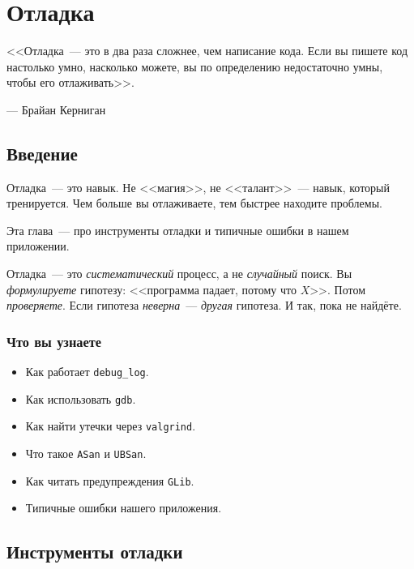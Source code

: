 
\chapter{Отладка}
\label{ch:debug}

\epigraph{<<Отладка~--- это в два раза сложнее, чем написание кода.
Если вы пишете код настолько умно, насколько можете, вы по
определению недостаточно умны, чтобы его отлаживать>>.}{---
Брайан Керниган}

\section{Введение}
\label{sec:debug-intro}

Отладка~--- это навык. Не <<магия>>, не <<талант>>~---
навык, который тренируется. Чем больше вы
отлаживаете, тем быстрее находите проблемы.

Эта глава~--- про инструменты отладки и типичные
ошибки в нашем приложении.

\begin{ideabox}
Отладка~--- это \emph{систематический} процесс, а не
\emph{случайный} поиск. Вы \emph{формулируете} гипотезу:
<<программа падает, потому что $X$>>. Потом \emph{проверяете}.
Если гипотеза \emph{неверна}~--- \emph{другая} гипотеза.
И так, пока не найдёте.
\end{ideabox}

\subsection{Что вы узнаете}

\begin{itemize}
    \item Как работает \texttt{debug\_log}.
    \item Как использовать \texttt{gdb}.
    \item Как найти утечки через \texttt{valgrind}.
    \item Что такое \texttt{ASan} и \texttt{UBSan}.
    \item Как читать предупреждения \texttt{GLib}.
    \item Типичные ошибки нашего приложения.
\end{itemize}

\section{Инструменты отладки}
\label{sec:debug-tools}

